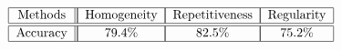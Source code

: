 \begin{table}[tb] \footnotesize 
$\begin{array}{ccccc}
\begin{tabular}{|c||c||}
\hline 
\multicolumn{1}{|c||}{Methods} \\ \hline \hline
Accuracy \\  \hline
\end{tabular}

\begin{tabular}{|c|c|}
\hline
\multicolumn{1}{|c|}{Homogeneity} \\ \hline \hline
79.4\%  \\ \hline
\end{tabular}

\begin{tabular}{|c|c|}
\hline
\multicolumn{1}{|c|}{Repetitiveness} \\ \hline \hline
82.5\%  \\ \hline
\end{tabular}

\begin{tabular}{|c|c|}
\hline 
\multicolumn{1}{|c|}{Regularity} \\ \hline \hline
75.2\%  \\  \hline
\end{tabular}
\end{array} $
\vspace{1mm}
\centering 
\caption{ Accuracy of the estimation of three texture properties. 
} \label{table:fet}
\end{table}

